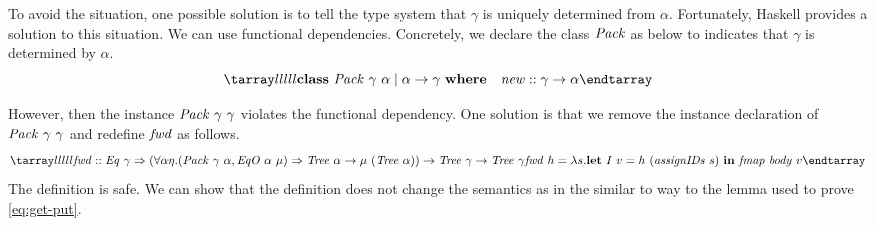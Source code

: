 \documentclass{article}
\theoremstyle{definition}
\begin{document}
To avoid the situation, one possible solution is to tell the type system that $\gamma$ is uniquely determined from $\alpha$. Fortunately, Haskell provides 
a solution to this situation. We can use functional dependencies. 
Concretely, we declare the class $\mathit{Pack}$ as below to indicates that $\gamma$ is determined by $\alpha$.
\[
\bb
 \key{class}~\mi{Pack}~\gamma~\alpha \mid \alpha \to \gamma 
  ~\key{where}\\
  \quad \mi{new} :: \gamma \to \alpha 
\ee
\]

However, then the instance $\mathit{Pack}~\gamma~\gamma$ violates the functional dependency. One solution is that we remove the instance declaration of $\mathit{Pack}~\gamma~\gamma$ and redefine $\mathit{fwd}$ as follows. 
\[
\bb
\mi{fwd} :: \mi{Eq}~\gamma \Rightarrow (
 \forall \alpha \eta. (\mi{Pack}~\gamma~\alpha, \mi{EqO}~\alpha~\mu) \Rightarrow 
 \mi{Tree}~\alpha \to \mu~(\mi{Tree}~\alpha))
 \to \mi{Tree}~\gamma \to \mi{Tree}~\gamma\\
\mi{fwd}~h = \lambda s. 
    \key{let}~\mi{I}~v = h~(\mi{assignIDs}~s)~\key{in}~\mi{fmap}~\mi{body}~v 
\ee
\]
The definition is safe. We can show that the definition does not change the semantics as in the similar to way to the lemma used to prove \ref{eq:get-put}.




\end{document}
